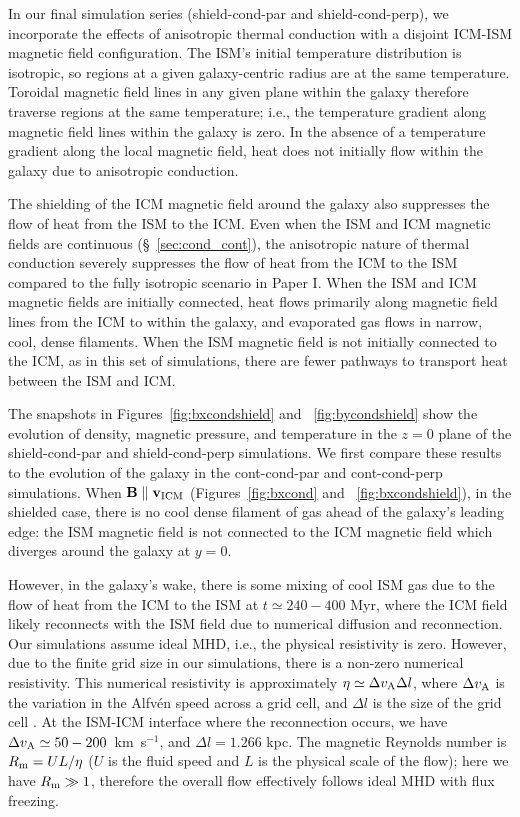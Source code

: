 \documentclass[twocolumn]{aastex6}
\begin{document}
In our final simulation series (shield-cond-par and shield-cond-perp), we incorporate the effects of anisotropic thermal conduction with a disjoint ICM-ISM magnetic field configuration. The ISM's initial temperature distribution is isotropic, so regions at a given galaxy-centric radius are at the same temperature. Toroidal magnetic field lines in any given plane within the galaxy therefore traverse regions at the same temperature; i.e., the temperature gradient along magnetic field lines within the galaxy is zero. In the absence of a temperature gradient along the local magnetic field, heat does not initially flow within the galaxy due to anisotropic conduction. 

The shielding of the ICM magnetic field around the galaxy also suppresses the flow of heat from the ISM to the ICM. Even when the ISM and ICM magnetic fields are continuous (\S~\ref{sec:cond_cont}), the anisotropic nature of thermal conduction severely suppresses the flow of heat from the ICM to the ISM compared to the fully isotropic scenario in Paper I. When the ISM and ICM magnetic fields are initially connected, heat flows primarily along magnetic field lines from the ICM to within the galaxy, and evaporated gas flows in narrow, cool, dense filaments. When the ISM magnetic field is not initially connected to the ICM, as in this set of simulations, there are fewer pathways to transport heat between the ISM and ICM. 

The snapshots in Figures~\ref{fig:bxcondshield} and ~\ref{fig:bycondshield} show the evolution of density, magnetic pressure, and temperature in the $z = 0$ plane of the shield-cond-par and shield-cond-perp simulations. We first compare these results to the evolution of the galaxy in the cont-cond-par and cont-cond-perp simulations. When $\mathbf{B} \parallel \mathbf{v_{\rm ICM}}$ (Figures~\ref{fig:bxcond} and ~\ref{fig:bxcondshield}), in the shielded case, there is no cool dense filament of gas ahead of the galaxy's leading edge: the ISM magnetic field is not connected to the ICM magnetic field which diverges around the galaxy at $y = 0$.

However, in the galaxy's wake, there is some mixing of cool ISM gas due to the flow of heat from the ICM to the ISM at $t \simeq 240 - 400$ Myr, where the ICM field likely reconnects with the ISM field due to numerical diffusion and reconnection. Our simulations assume ideal MHD, i.e., the physical resistivity is zero. However, due to the finite grid size in our simulations, there is a non-zero numerical resistivity. This numerical resistivity is approximately $\eta \simeq \Delta v_{\rm A} \Delta l$, where $\Delta v_{\rm A}$ is the variation in the Alfv\'{e}n speed across a grid cell, and $\Delta l$ is the size of the grid cell \citep[e.g.,][]{Bodenheimer07}. At the ISM-ICM interface where the reconnection occurs, we have $\Delta v_{\rm A} \simeq 50 - 200$~km~s$^{-1}$, and $\Delta l = 1.266$ kpc.  The magnetic Reynolds number is $R_{\rm m} = UL / \eta$ ($U$ is the fluid speed and $L$ is the physical scale of the flow); here we have $R_{\rm m} \gg 1$, therefore the overall flow effectively follows ideal MHD with flux freezing.
\end{document}
